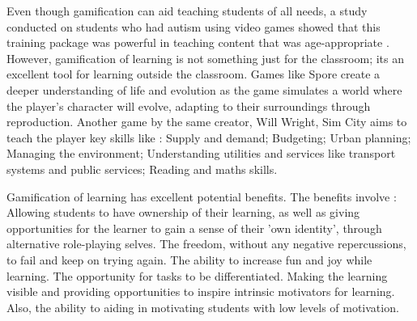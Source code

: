 		Even though gamification can aid teaching students of all needs, a study conducted on students who had autism using video games showed that this training package was powerful in teaching content that was age-appropriate \cite{autismedu}. However, gamification of learning is not something just for the classroom; its an excellent tool for learning outside the classroom. Games like Spore create a deeper understanding of life and evolution as the game simulates a world where the player's character will evolve, adapting to their surroundings through reproduction. Another game by the same creator, Will Wright, Sim City aims to teach the player key skills like \cite{simfact}: Supply and demand; Budgeting; Urban planning; Managing the environment; Understanding utilities and services like transport systems and public services; Reading and maths skills.
		
		Gamification of learning has excellent potential benefits. The benefits involve \cite{gamelearning}: Allowing students to have ownership of their learning, as well as giving opportunities for the learner to gain a sense of their 'own identity', through alternative role-playing selves. The freedom, without any negative repercussions, to fail and keep on trying again. The ability to increase fun and joy while learning. The opportunity for tasks to be differentiated. Making the learning visible and providing opportunities to inspire intrinsic motivators for learning. Also, the ability to aiding in motivating students with low levels of motivation.